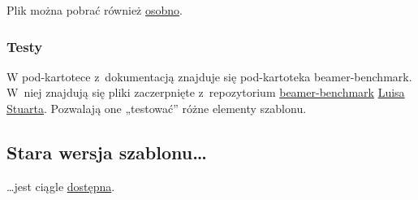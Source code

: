 Plik można pobrać również \href{http://kmim.wm.pwr.edu.pl/myszka/wp-content/uploads/sites/2/2018/11/oficyna_url.bst}{osobno}.

\subsubsection{Testy}

W pod-kartotece z~dokumentacją znajduje się pod-kartoteka beamer-benchmark. W~niej znajdują się pliki zaczerpnięte z~repozytorium \href{https://github.com/louisstuart96/beamer-benchmark}{beamer-benchmark} \href{https://github.com/louisstuart96}{Luisa Stuarta}. Pozwalają one „testować” różne elementy szablonu.

\subsection{Stara wersja szablonu…}

…jest ciągle \href{https://kmim.wm.pwr.edu.pl/myszka/projekty/szablon-prezentacji-pwr/szablon-prezentacji-zgodny-z-ksiega-logotypu/}{dostępna}.


%



